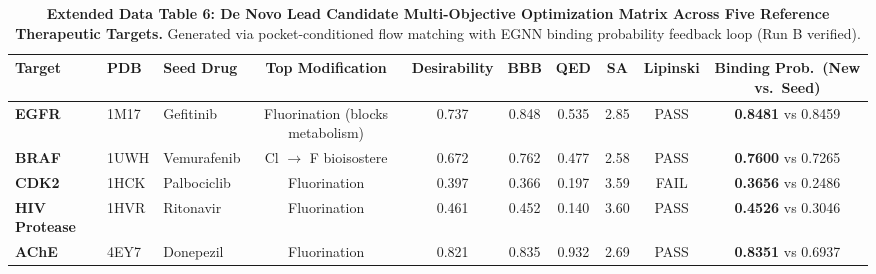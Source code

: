 \begin{table}[h!]
\caption{\textbf{Extended Data Table 6: De Novo Lead Candidate Multi-Objective Optimization Matrix Across Five Reference Therapeutic Targets.} Generated via pocket-conditioned flow matching with EGNN binding probability feedback loop (Run B verified).}
\label{tab:ed_denovo}
\centering
\footnotesize
\begin{tabular}{lllccccccc}
\toprule
\textbf{Target} & \textbf{PDB} & \textbf{Seed Drug} & \textbf{Top Modification} & \textbf{Desirability} & \textbf{BBB} & \textbf{QED} & \textbf{SA} & \textbf{Lipinski} & \textbf{Binding Prob.\ (New vs.\ Seed)} \\
\midrule
\textbf{EGFR} & 1M17 & Gefitinib & Fluorination (blocks metabolism) & 0.737 & 0.848 & 0.535 & 2.85 & PASS & \textbf{0.8481} vs 0.8459 \\
\textbf{BRAF} & 1UWH & Vemurafenib & Cl $\to$ F bioisostere & 0.672 & 0.762 & 0.477 & 2.58 & PASS & \textbf{0.7600} vs 0.7265 \\
\textbf{CDK2} & 1HCK & Palbociclib & Fluorination & 0.397 & 0.366 & 0.197 & 3.59 & FAIL & \textbf{0.3656} vs 0.2486 \\
\textbf{HIV Protease} & 1HVR & Ritonavir & Fluorination & 0.461 & 0.452 & 0.140 & 3.60 & PASS & \textbf{0.4526} vs 0.3046 \\
\textbf{AChE} & 4EY7 & Donepezil & Fluorination & 0.821 & 0.835 & 0.932 & 2.69 & PASS & \textbf{0.8351} vs 0.6937 \\
\bottomrule
\end{tabular}
\end{table}

\vspace{1em}

